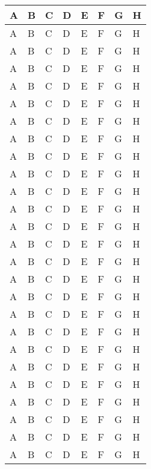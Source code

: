 \documentclass[12pt,a4paper]{article}
\begin{document}
\begin{longtable}{|p{}|p{}|p{}|p{}|p{}|p{}|p{}|p{}|}
A & B & C & D & E & F & G & H \\  \hline
A & B & C & D & E & F & G & H \\  \hline
A & B & C & D & E & F & G & H \\  \hline
A & B & C & D & E & F & G & H \\  \hline
A & B & C & D & E & F & G & H \\  \hline
A & B & C & D & E & F & G & H \\  \hline
A & B & C & D & E & F & G & H \\  \hline
A & B & C & D & E & F & G & H \\  \hline
A & B & C & D & E & F & G & H \\  \hline
A & B & C & D & E & F & G & H \\  \hline
A & B & C & D & E & F & G & H \\  \hline
A & B & C & D & E & F & G & H \\  \hline
A & B & C & D & E & F & G & H \\  \hline
A & B & C & D & E & F & G & H \\  \hline
A & B & C & D & E & F & G & H \\  \hline
A & B & C & D & E & F & G & H \\  \hline
A & B & C & D & E & F & G & H \\  \hline
A & B & C & D & E & F & G & H \\  \hline
A & B & C & D & E & F & G & H \\  \hline
A & B & C & D & E & F & G & H \\  \hline
A & B & C & D & E & F & G & H \\  \hline
A & B & C & D & E & F & G & H \\  \hline
A & B & C & D & E & F & G & H \\  \hline
A & B & C & D & E & F & G & H \\  \hline
A & B & C & D & E & F & G & H \\  \hline
A & B & C & D & E & F & G & H \\  \hline
\end{longtable}
\end{document}
